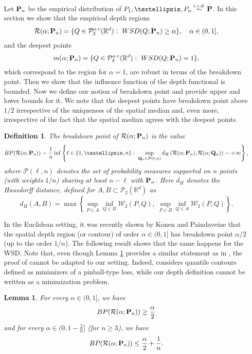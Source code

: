 \documentclass{imsart}
\newtheorem {Lemma}[Proposition] {Lemma}
\newtheorem {Definition}{Definition}[section]
\numberwithin{equation}{section}
\def\R{\mathbb{R}}
\begin{document}
Let ${\bf P}_n$ be the empirical distribution of $P_1, \dots, P_n \stackrel{i.i.d.}{\sim} {\bf P}$. 
In this section we show that the empirical depth regions 
$$ \mathcal{R}(\alpha;{\bf P}_n)= \{ Q\in \mathcal{P}_2^{a.c}(\R^d):\ { \rm WSD}(Q;{\bf P}_n) \ge \alpha \}, \quad \alpha\in (0,1],$$
and the deepest points 
$$ {\rm m}(\alpha;{\bf P}_n)=  \{ Q\in \mathcal{P}_2^{a.c}(\R^d):\ { \rm WSD}(Q;{\bf P}_n)=1 \},$$
which correspond to the region for $\alpha=1$,
are robust in terms of the breakdown point. Then we show that the influence function of the depth functional is bounded. Now we define our notion of breakdown point and provide upper and lower bounds for it. We note that the deepest points have breakdown point above $1/2$ irrespective of the uniqueness of the spatial median and, even more, irrespective of the fact that the spatial median agrees with the deepest points.
\begin{Definition}
	The breakdown point of $\mathcal{R}(\alpha;{\bf P}_n)$ is the value 
	$$ {\rm BP}(\mathcal{R}(\alpha;{\bf P}_n)) = \frac{1}{n}\inf\left\{ \ell \in \{1, \dots, n\}:\  \sup_{{\bf Q}_{n}\in \mathcal{P}({\ell,n})}d_H \left(\mathcal{R}(\alpha; {\bf P}_n) ,\mathcal{R}(\alpha;{\bf Q}_{n})\right)=+\infty  \right\}, $$
	where $\mathcal{P}({\ell,n})$ denotes the set of probability  measures supported on $n$ points (with weights $1/n$)  sharing at least $n-\ell$ with ${\bf P}_n$. Here $d_H$ denotes the Hausdorff distance, defined for $A,B\subset \mathcal{P}_2(\R^d)$ as 
	\[
	d_H(A, B) = \max\left\{
	\sup_{P \in A} \inf_{Q \in B} \mathcal{W}_2(P, Q), \;
	\sup_{P \in B} \inf_{Q \in A} \mathcal{W}_2(P, Q)
	\right\}.
	\]
\end{Definition}
In the Euclidean setting, it was recently shown by Konen and  Paindaveine \cite{Dimitri}  that the spatial depth region (or contour) of order $\alpha\in (0,1] $ has breakdown point $ \alpha/2  $ (up to the order $1/n$). The following result shows that the same happens for the WSD. Note that, even though Lemma \ref{lemma:breakdown} provides a similar statement as in \cite{Dimitri}, the proof of \cite{Dimitri} cannot be adapted to our setting. Indeed, \cite{Dimitri} considers quantile contours defined as minimizers of a pinball-type loss, while our depth definition cannot be written as a minimization problem.


\begin{Lemma}\label{lemma:breakdown}
	For every $\alpha\in (0,1]$, we have
	\[ {\rm BP}(\mathcal{R}(\alpha;{\bf P}_n)) 
	\ge \frac{\alpha}{2}
	\]
	and for every $\alpha\in (0,1 - \frac{2}{n} ]$ (for $n \ge 3$), we have
	\[
	{\rm BP}(\mathcal{R}(\alpha;{\bf P}_n)) \le
	\frac{\alpha}{2} + \frac{1}{n}. 
	\]
\end{Lemma}
\end{document}
